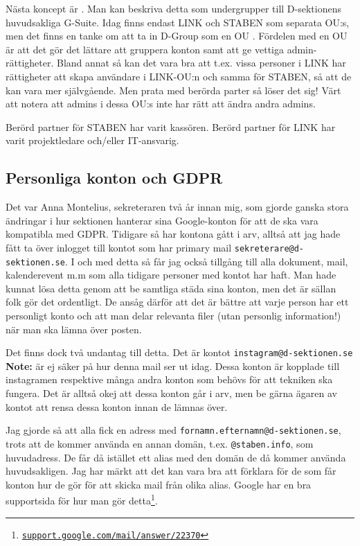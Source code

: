 \documentclass[../testamente_sekreterare_21-22.tex]{subfiles}
\begin{document}
Nästa koncept är . Man kan beskriva detta som undergrupper till D-sektionens huvudsakliga G-Suite. Idag finns endast LINK och STABEN som separata OU:s, men det finns en tanke om att ta in D-Group som en OU . Fördelen med en OU är att det gör det lättare att gruppera konton samt att ge vettiga admin-rättigheter. Bland annat så kan det vara bra att t.ex. vissa personer i LINK har rättigheter att skapa användare i LINK-OU:n och samma för STABEN, så att de kan vara mer självgående. Men prata med berörda parter så löser det sig! Värt att notera att admins i dessa OU:s inte har rätt att ändra andra admins.

Berörd partner för STABEN har varit kassören. Berörd partner för LINK har varit projektledare och/eller IT-ansvarig.

\subsection{Personliga konton och GDPR}
\label{sec:gsuite_gdpr}
Det var Anna Montelius, sekreteraren två år innan mig, som gjorde ganska stora ändringar i hur sektionen hanterar sina Google-konton för att de ska vara kompatibla med GDPR. Tidigare så har kontona gått i arv, alltså att jag hade fått ta över inlogget till kontot som har primary mail \texttt{sekreterare@d-sektionen.se}. I och med detta så får jag också tillgång till alla dokument, mail, kalenderevent m.m som alla tidigare personer med kontot har haft. Man hade kunnat lösa detta genom att be samtliga städa sina konton, men det är sällan folk gör det ordentligt. De ansåg därför att det är bättre att varje person har ett personligt konto och att man delar relevanta filer (utan personlig information!) när man ska lämna över posten.

Det finns dock två undantag till detta. Det är kontot \texttt{instagram@d-sektionen.se} \textbf{Note: } är ej säker på hur denna mail ser ut idag. Dessa konton är kopplade till instagramen respektive många andra konton som behövs för att tekniken ska fungera. Det är alltså okej att dessa konton går i arv, men be gärna ägaren av kontot att rensa dessa konton innan de lämnas över.

Jag gjorde så att alla fick en adress med \texttt{fornamn.efternamn@d-sektionen.se}, trots att de kommer använda en annan domän, t.ex. \texttt{@staben.info}, som huvudadress. De får då istället ett alias med den domän de då kommer använda huvudsakligen. Jag har märkt att det kan vara bra att förklara för de som får konton hur de gör för att skicka mail från olika alias. Google har en bra supportsida för hur man gör detta\footnote{\href{https://support.google.com/mail/answer/22370}{\texttt{support.google.com/mail/answer/22370}}}.
\end{document}
